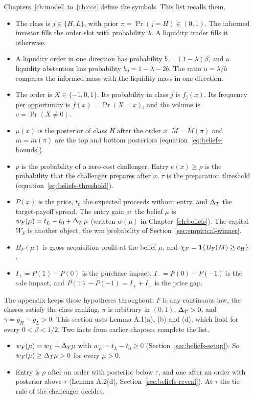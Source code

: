 Chapters~\ref{ch:model} to~\ref{ch:ccc} define the symbols. This list recalls them.
\begin{itemize}
\item The class is \(j\in\{H,L\}\), with prior \(\pi=\Pr(j=H)\in(0,1)\). The informed investor fills the order slot with probability \(\lambda\). A liquidity trader fills it otherwise.
\item A liquidity order in one direction has probability \(b=(1-\lambda)\beta\), and a liquidity abstention has probability \(b_0=1-\lambda-2b\). The ratio \(u=\lambda/b\) compares the informed mass with the liquidity mass in one direction.
\item The order is \(X\in\{-1,0,1\}\). Its probability in class \(j\) is \(f_j(x)\). Its frequency per opportunity is \(\bar f(x)=\Pr(X=x)\), and the volume is \(v=\Pr(X\ne0)\).
\item \(\mu(x)\) is the posterior of class \(H\) after the order \(x\). \(M=M(\pi)\) and \(m=m(\pi)\) are the top and bottom posteriors (equation~\eqref{eq:beliefs-bounds}).
\item \(\rho\) is the probability of a zero-cost challenger. Entry \(e(x)\ge\rho\) is the probability that the challenger prepares after \(x\). \(\tau\) is the preparation threshold (equation~\eqref{eq:beliefs-threshold}).
\item \(P(x)\) is the price, \(t_0\) the expected proceeds without entry, and \(\Delta_T\) the target-payoff spread. The entry gain at the belief \(\mu\) is \(w_F(\mu)=t_L-t_0+\Delta_T\,\mu\) (written \(w(\mu)\) in Chapter~\ref{ch:beliefs}). The capital \(W_F\) is another object, the win probability of Section~\ref{sec:empirical-winner}.
\item \(B_F(\mu)\) is gross acquisition profit at the belief \(\mu\), and \(\chi_F=\mathbf{1}\{B_F(M)\ge c_H\}\).
\item \(I_+=P(1)-P(0)\) is the purchase impact, \(I_-=P(0)-P(-1)\) is the sale impact, and \(P(1)-P(-1)=I_++I_-\) is the price gap.
\end{itemize}

The appendix keeps these hypotheses throughout: \(F\) is any continuous law, the classes satisfy the class ranking, \(\pi\) is arbitrary in \((0,1)\), \(\Delta_T>0\), and \(\gamma=g_H-g_L>0\). This section uses Lemma A.1(a), (b) and (d), which hold for every \(0<\beta<1/2\). Two facts from earlier chapters complete the list.
\begin{itemize}
\item \(w_F(\mu)=w_L+\Delta_T\mu\) with \(w_L=t_L-t_0\ge0\) (Section~\ref{sec:beliefs-setup}). So \(w_F(\mu)\ge\Delta_T\mu>0\) for every \(\mu>0\).
\item Entry is \(\rho\) after an order with posterior below \(\tau\), and one after an order with posterior above \(\tau\) (Lemma A.2(d), Section~\ref{sec:beliefs-reveal}). At \(\tau\) the tie rule of the challenger decides.
\end{itemize}

